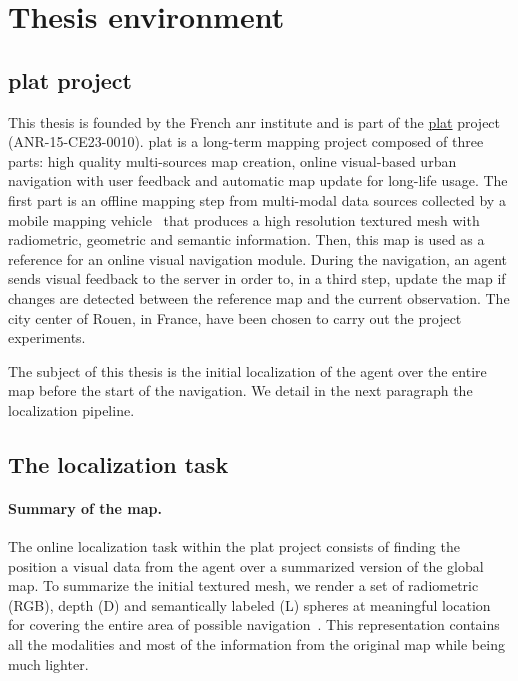 \section{Thesis environment}
\label{sec:thesis_env}

\subsection{\acs*{plat} project}
\label{subsec:platinum}
This thesis is founded by the French \Ac{anr} institute and is part of the \href{http://platinum.projets.litislab.fr/}{\ac{plat}} project (ANR-15-CE23-0010). \Ac{plat} is a long-term mapping project composed of three parts: high quality multi-sources map creation, online visual-based urban navigation with user feedback and automatic map update for long-life usage. The first part is an offline mapping step from multi-modal data sources collected by a mobile mapping vehicle~\citep{Paparoditis2012,Boussaha2018,Boussaha2018a} that produces a high resolution textured mesh with radiometric, geometric and semantic information. Then, this map is used as a reference for an online visual navigation module. During the navigation, an agent sends visual feedback to the server in order to, in a third step, update the map if changes are detected between the reference map and the current observation. The city center of Rouen, in France, have been chosen to carry out the project experiments.

The subject of this thesis is the initial localization of the agent over the entire map before the start of the navigation. We detail in the next paragraph the localization pipeline.

\subsection{The localization task}
\paragraph{Summary of the map.}
The online localization task within the \ac{plat} project consists of finding the position a visual data from the agent over a summarized version of the global map. To summarize the initial textured mesh, we render a set of radiometric (RGB), depth (D) and semantically labeled (L) spheres at meaningful location for covering the entire area of possible navigation~\citep{Salah2017, Salah2018, Salah2018a}. This representation contains all the modalities and most of the information from the original map while being much lighter.

